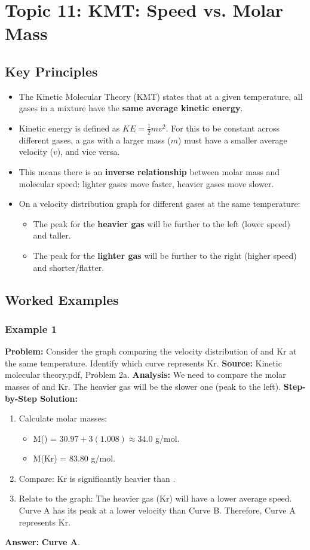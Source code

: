\documentclass{article}
\begin{document}
\section{Topic 11: KMT: Speed vs. Molar Mass}
\subsection{Key Principles}
\begin{itemize}
    \item The Kinetic Molecular Theory (KMT) states that at a given temperature, all gases in a mixture have the \textbf{same average kinetic energy}.
    \item Kinetic energy is defined as $KE = \frac{1}{2}mv^2$. For this to be constant across different gases, a gas with a larger mass ($m$) must have a smaller average velocity ($v$), and vice versa.
    \item This means there is an \textbf{inverse relationship} between molar mass and molecular speed: lighter gases move faster, heavier gases move slower.
    \item On a velocity distribution graph for different gases at the same temperature:
        \begin{itemize}
            \item The peak for the \textbf{heavier gas} will be further to the left (lower speed) and taller.
            \item The peak for the \textbf{lighter gas} will be further to the right (higher speed) and shorter/flatter.
        \end{itemize}
\end{itemize}

\subsection{Worked Examples}
\subsubsection{Example 1}
\textbf{Problem:} Consider the graph comparing the velocity distribution of  and Kr at the same temperature. Identify which curve represents Kr.
\textbf{Source:} Kinetic molecular theory.pdf, Problem 2a.
\textbf{Analysis:} We need to compare the molar masses of  and Kr. The heavier gas will be the slower one (peak to the left).
\textbf{Step-by-Step Solution:}
\begin{enumerate}
    \item Calculate molar masses:
    \begin{itemize}
        \item M() = $30.97 + 3(1.008) \approx 34.0$ g/mol.
        \item M(Kr) = $83.80$ g/mol.
    \end{itemize}
    \item Compare: Kr is significantly heavier than .
    \item Relate to the graph: The heavier gas (Kr) will have a lower average speed. Curve A has its peak at a lower velocity than Curve B. Therefore, Curve A represents Kr.
\end{enumerate}
\textbf{Answer:} \textbf{Curve A}.
\end{document}
